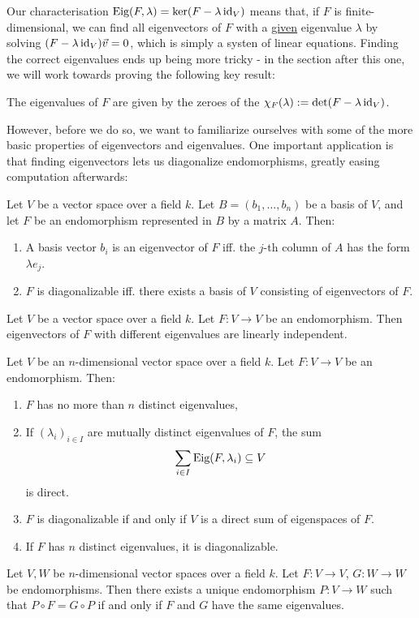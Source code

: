 Our characterisation $\textnormal{Eig}(F, \lambda) = \ker(F - \lambda \operatorname{id}_V)$ means that, if $F$ is finite-dimensional, we can find all eigenvectors of $F$ with a \ul{given} eigenvalue $\lambda$ by solving $(F - \lambda \operatorname{id}_V)\vec{v} = 0$, which is simply a systen of linear equations. Finding the correct eigenvalues ends up being more tricky - in the section after this one, we will work towards proving the following key result:
\begin{proposition}
	The eigenvalues of $F$ are given by the zeroes of the  $\chi_F(\lambda) := \det(F - \lambda \operatorname{id}_V)$.
\end{proposition}
However, before we do so, we want to familiarize ourselves with some of the more basic properties of eigenvectors and eigenvalues.
\newpar
One important application is that finding eigenvectors lets us diagonalize endomorphisms, greatly easing computation afterwards:
\begin{theorem}
	Let $V$ be a vector space over a field $k$. Let $B = (b_1, \hdots, b_n)$ be a basis of $V$, and let $F$ be an endomorphism represented in $B$ by a matrix $A$. Then:
	\begin{enumerate}
		\item A basis vector $b_i$ is an eigenvector of $F$ iff. the $j$-th column of $A$ has the form $\lambda e_j$.
		\item $F$ is diagonalizable iff. there exists a basis of $V$ consisting of eigenvectors of $F$.
	\end{enumerate}
\end{theorem}
\begin{theorem}
	Let $V$ be a vector space over a field $k$. Let $F : V \to V$ be an endomorphism. Then eigenvectors of $F$ with different eigenvalues are linearly independent.
\end{theorem}
\begin{corollary}
	Let $V$ be an $n$-dimensional vector space over a field $k$. Let $F : V \to V$ be an endomorphism. Then:
	\begin{enumerate}
		\item $F$ has no more than $n$ distinct eigenvalues,
		\item If $(\lambda_i)_{i \in I}$ are mutually distinct eigenvalues of $F$, the sum
		\begin{align*}
			\sum_{i \in I} \textnormal{Eig}(F, \lambda_i)
			\subseteq
			V
		\end{align*}
		is direct.
		\item $F$ is diagonalizable if and only if $V$ is a direct sum of eigenspaces of $F$.
		\item If $F$ has $n$ distinct eigenvalues, it is diagonalizable.
	\end{enumerate}
\end{corollary}
\begin{corollary}
	Let $V,W$ be $n$-dimensional vector spaces over a field $k$. Let $F: V \to V$, $G : W \to W$ be endomorphisms. Then there exists a unique endomorphism $P : V \to W$ such that $P \circ F = G \circ P$ if and only if $F$ and $G$ have the same eigenvalues.
\end{corollary}
